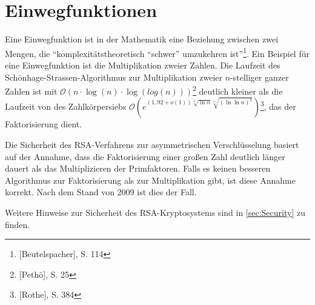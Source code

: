 \section{Einwegfunktionen}
Eine Einwegfunktion ist in der Mathematik eine Beziehung zwischen 
zwei Mengen, die "`komplexitätstheoretisch "`schwer"' umzukehren ist"'\footnote{[Beutelspacher], S. 114}. 
Ein Beispiel für eine Einwegfunktion ist die Multiplikation zweier 
Zahlen. Die Laufzeit des Schönhage-Strassen-Algorithmus zur 
Multiplikation zweier $n$-stelliger ganzer Zahlen ist mit
$\mathcal{O}(n \cdot \log(n) \cdot \log(log(n)))$\footnote{[Pethö], S. 25}
deutlich kleiner als die Laufzeit von  des Zahlkörpersiebs 
$\mathcal{O}(e^{(1,92+o(1)) \sqrt[3]{\ln n} \sqrt[3]{(\ln \ln n)^2}})$\footnote{[Rothe], S. 384}, 
das der Faktorisierung dient.

Die Sicherheit des RSA-Verfahrens zur asymmetrischen 
Verschlüsselung basiert auf der Annahme, dass die Faktorisierung 
einer großen Zahl deutlich länger dauert als das Multiplizieren der 
Primfaktoren. Falls es keinen besseren Algorithmus zur Faktorisierung 
als zur Multiplikation gibt, ist diese Annahme korrekt. Nach dem 
Stand von 2009 ist dies der Fall.

Weitere Hinweise zur Sicherheit des RSA-Kryptosystems sind in \cref{sec:Security} zu finden.
